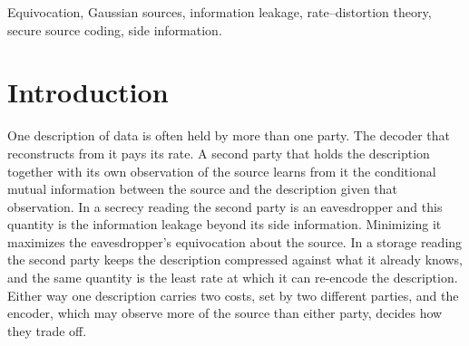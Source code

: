 \documentclass[11pt,onecolumn]{IEEEtran}
\begin{document}
\begin{IEEEkeywords}
Equivocation, Gaussian sources, information leakage, rate--distortion
theory, secure source coding, side information.
\end{IEEEkeywords}

\section{Introduction}
\label{sec:intro}

One description of data is often held by more than one party. The
decoder that reconstructs from it pays its rate. A second party that
holds the description together with its own observation of the source
learns from it the conditional mutual information between the source and
the description given that observation. In a secrecy reading the second
party is an eavesdropper and this quantity is the information leakage
beyond its side information. Minimizing it maximizes the eavesdropper's
equivocation about the source. In a storage reading the second party
keeps the description compressed against what it already knows, and the
same quantity is the least rate at which it can re-encode the
description. Either way one description carries two costs, set by two
different parties, and the encoder, which may observe more of the
source than either party, decides how they trade off.
\end{document}
